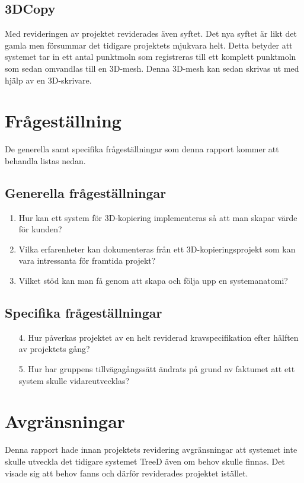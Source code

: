 \subsection{3DCopy}
Med revideringen av projektet reviderades även syftet. Det nya syftet är likt det gamla men försummar det tidigare projektets mjukvara helt. Detta betyder att systemet tar in ett antal punktmoln som registreras till ett komplett punktmoln som sedan omvandlas till en 3D-mesh. Denna 3D-mesh kan sedan skrivas ut med hjälp av en 3D-skrivare.


\section{Frågeställning}
\label{sec:research-questions}
De generella samt specifika frågeställningar som denna rapport kommer att behandla listas nedan.

\subsection{Generella frågeställningar}

\begin{enumerate}
	\item Hur kan ett system för 3D-kopiering implementeras så att man skapar värde för kunden?
	\item Vilka erfarenheter kan dokumenteras från ett 3D-kopieringsprojekt som kan vara intressanta för framtida projekt?
	\item Vilket stöd kan man få genom att skapa och följa upp en systemanatomi?
\end{enumerate}
	
\subsection{Specifika frågeställningar}

\begin{enumerate}
	\item [4.] Hur påverkas projektet av en helt reviderad kravspecifikation efter hälften av projektets gång?
	\item [5.] Hur har gruppens tillvägagångssätt ändrats på grund av faktumet att ett system skulle vidareutvecklas? 
	
\end{enumerate}

\section{Avgränsningar}
\label{sec:delimitations}
Denna rapport hade innan projektets revidering avgränsningar att systemet inte skulle utveckla det tidigare systemet TreeD även om behov skulle finnas. Det visade sig att behov fanns och därför reviderades projektet istället.


